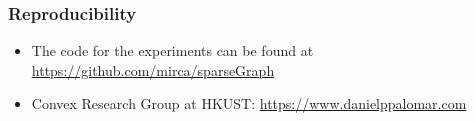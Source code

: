 \documentclass[aspectratio=169]{beamer}
\begin{document}
%

    \begin{frame}
      \frametitle{Reproducibility}
    \begin{itemize}
      \item The code for the experiments can be found at \url{https://github.com/mirca/sparseGraph} \vspace{1cm}
      \item Convex Research Group at HKUST: {\color{purple}\url{https://www.danielppalomar.com}}
    \end{itemize}
    \end{frame}
\end{document}
